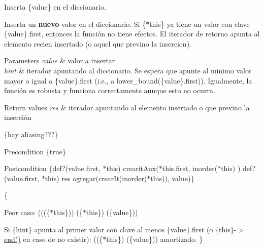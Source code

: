 \-Inserta \{value\} en el diccionario. 

\-Inserta un {\bfseries nuevo} valor en el diccionario. \-Si \{$\ast$this\} ya tiene un valor con clave \{value\}.first, entonces la función no tiene efectos. \-El iterador de retorno apunta al elemento recien insertado (o aquel que previno la insercion).


\begin{DoxyParams}{\-Parameters}
{\em value} & valor a insertar \\
\hline
{\em hint} & iterador apuntando al diccionario. \-Se espera que apunte al minimo valor mayor o igual a \{value\}.first (i.\-e., a lower\-\_\-bound(\{value\}.first)). \-Igualmente, la función es robusta y funciona correctamente aunque esto no ocurra. \\
\hline
\end{DoxyParams}

\begin{DoxyRetVals}{\-Return values}
{\em res} & iterador apuntando al elemento insertado o que previno la inserción\\
\hline
\end{DoxyRetVals}
\{hay aliasing???\}

\begin{DoxyPrecond}{\-Precondition}
\{true\} 
\end{DoxyPrecond}
\begin{DoxyPostcond}{\-Postcondition}
\{def?(value.\-first, $\ast$this)  crearit\-Aux($\ast$this.first, inorder($\ast$this) )   def?(value.\-first, $\ast$this)  res  agregar(crear\-It(inorder($\ast$this)), value)\}
\end{DoxyPostcond}
\{
\begin{DoxyItemize}
\item \-Peor caso\-: (((\{$\ast$this\}))  (\{$\ast$this\})  (\{value\}))
\item \-Si \{hint\} apunta al primer valor con clave al menos \{value\}.first (o \{this\}-\/$>$\hyperlink{classaed2_1_1map_a76023e6a56cb625513e1b5ea028bf983}{end()} en caso de no existir)\-: ((\{$\ast$this\})  (\{value\})) amortizado. \}
\end{DoxyItemize}

